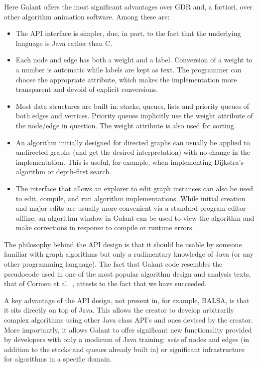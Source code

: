 Here Galant offers the most significant advantages over GDR and, a fortiori,
over other algorithm animation software. Among these are:

\begin{itemize}

\item
  The API interface is simpler, due, in part, to the fact that the
  underlying language is Java rather than C.
\item
  Each node and edge has both a weight and a label. Conversion of a weight to
  a number is automatic while labels are kept as text. The programmer can
  choose the appropriate attribute, which makes the implementation more
  transparent and devoid of explicit conversions.

\item
  Most data structures are built in: stacks, queues, lists and priority
  queues of both edges and vertices. Priority queues implicitly use the
  weight attribute of the node/edge in question. The weight attribute is also
  used for sorting.

\item
  An algorithm initially designed for directed graphs can usually be applied
  to undirected graphs (and get the desired interpretation) with no change in
  the implementation.
  This is useful, for example, when implementing Dijkstra's
  algorithm or depth-first search.

\item
  The interface that allows an explorer to edit graph instances can also be used
  to edit, compile, and run algorithm implementations. While initial creation
  and major edits are usually more convenient via a standard program editor
  offline, an algorithm window in Galant can be used to view the algorithm and
  make corrections in response to compile or runtime errors.

\end{itemize}

The philosophy behind the API design is that it should be usable by someone
familiar with graph algorithms but only a rudimentary knowledge of Java (or
any other programming language).
The fact that Galant code resembles the pseudocode used
in one of the most
popular algorithm design and analysis texts, that of Cormen et al.~\cite{2009-Intro_to_Algorithms-Cormen},
attests to the fact that we have succeeded.

A key advantage of the API design, not present in, for example, BALSA, is that it sits directly on top of Java.
This allows the creator to develop arbitrarily complex algorithms using other Java class API's and ones devised by the creator.
More importantly, it allows Galant to offer significant new functionality
provided by developers with only a modicum of Java training:
\emph{sets} of nodes and edges (in addition to the stacks and queues already
built in) or significant infrastructure for algorithms in a specific domain.

